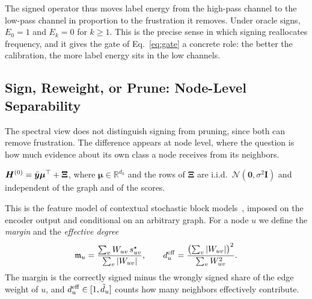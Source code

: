 The signed operator thus moves label energy from the high-pass channel to the low-pass channel in proportion to the frustration it removes.
Under oracle signs, $E_0=1$ and $E_k=0$ for $k\ge1$.
This is the precise sense in which signing reallocates frequency, and it gives the gate of Eq.~\eqref{eq:gate} a concrete role: the better the calibration, the more label energy sits in the low channels.

\subsection{Sign, Reweight, or Prune: Node-Level Separability}\label{sec:theory-node}

The spectral view does not distinguish signing from pruning, since both can remove frustration.
The difference appears at node level, where the question is how much evidence about its own class a node receives from its neighbors.

\begin{assumption}\label{ass:features}
$\bm H^{(0)}=\bar{\bm{y}}\bm\mu^{\top}+\bm\Xi$, where $\bm\mu\in\mathbb R^{d_h}$ and the rows of $\bm\Xi$ are i.i.d.\ $\mathcal N(\bm 0,\sigma^2\bm I)$ and independent of the graph and of the scores.
\end{assumption}

This is the feature model of contextual stochastic block models~\citep{CSBM,GCTheory}, imposed on the encoder output and conditional on an arbitrary graph.
For a node $u$ we define the \emph{margin} and the \emph{effective degree}
\begin{equation}
\mathfrak{m}_u=\frac{\sum_vW_{uv}\,s^{\star}_{uv}}{\sum_v|W_{uv}|},\qquad
d^{\mathrm{eff}}_u=\frac{\bigl(\sum_v|W_{uv}|\bigr)^2}{\sum_vW_{uv}^2}.
\label{eq:margin}
\end{equation}
The margin is the correctly signed minus the wrongly signed share of the edge weight of $u$, and $d^{\mathrm{eff}}_u\in[1,\tilde d_u]$ counts how many neighbors effectively contribute.

